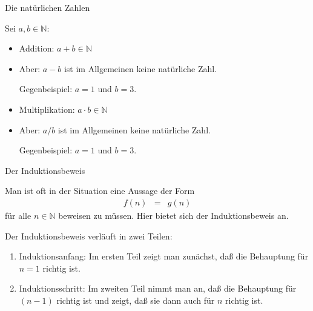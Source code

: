 \documentclass[german]{beamer}
\newcommand{\bq}{\begin{eqnarray*}}
\newcommand{\eq}{\end{eqnarray*}}
\begin{document}
\begin{frame}{Die nat\"urlichen Zahlen}

Sei $a, b \in {\mathbb N}$:
\begin{itemize}
\item \alert{Addition}: $a+b \in {\mathbb N}$
\item Aber: $a-b$ ist im Allgemeinen keine nat\"urliche Zahl.

Gegenbeispiel: $a=1$ und $b=3$.
\item \alert{Multiplikation}: $a \cdot b \in {\mathbb N}$
\item Aber: $a/b$ ist im Allgemeinen keine nat\"urliche Zahl.

Gegenbeispiel: $a=1$ und $b=3$.
\end{itemize}

\end{frame}

\begin{frame}{Der Induktionsbeweis}

Man ist oft in der Situation
eine Aussage der Form
\bq
 f(n) & = & g(n)
\eq
\alert{f\"ur alle $n \in {\mathbb N}$} beweisen zu m\"ussen. Hier bietet sich der Induktionsbeweis an.

\vspace*{3mm}

Der Induktionsbeweis verl\"auft in zwei Teilen: 
\begin{enumerate}
\item Induktionsanfang: Im ersten Teil zeigt man zun\"achst, da{\ss} die Behauptung f\"ur $n=1$ richtig ist.
\item Induktionsschritt: Im zweiten Teil nimmt man an, da{\ss} die Behauptung f\"ur $(n-1)$ richtig ist und zeigt, da{\ss} sie dann auch f\"ur $n$ richtig ist.
\end{enumerate}

\end{frame}
\end{document}
